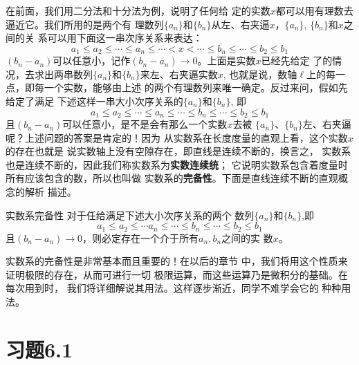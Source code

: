 在前面，我们用二分法和十分法为例，说明了任何给
定的实数$x$都可以用有理数去逼近它。我们所用的是两个有
理数列$\{a_n\}$和$\{b_n\}$从左、右夹逼$x$，$\{a_n\}$, $\{b_n\}$和$x$之间的关
系可以用下面这一串次序关系来表达：
\[a_1\le a_2\le\cdots\le a_n\le \cdots <x<\cdots\le b_n\le \cdots\le b_2\le b_1\]
$(b_n-a_n)$可以任意小，记作$(b_n-a_n)\to 0$。上面是实数$x$已经先给定
了的情况，去求出两串数列$\{a_n\}$和$\{b_n\}$来左、右夹逼实数$x$,
也就是说，数轴$\ell$上的每一点，即每一个实数，能够由上述
的两个有理数列来唯一确定。反过来问，假如先给定了满足
下述这样一串大小次序关系的$\{a_n\}$和$\{b_n\}$, 即
\[a_1\le a_2\le\cdots\le a_n\le \cdots \le b_n\le \cdots\le b_2\le b_1\]
且$(b_n-a_n)$可以任意小，是不是会有那么一个实数$x$去被
$\{a_n\}$、$\{b_n\}$左、右夹逼呢？上述问题的答案是肯定的！因为
从实数系在长度度量的直观上看，这个实数$x$的存在也就是
说实数轴上没有空隙存在，即直线是连续不断的，换言之，
实数系也是连续不断的，因此我们称实数系为\textbf{实数连续统}；
它说明实数系包含着度量时所有应该包含的数，所以也叫做
实数系的\textbf{完备性}。下面是直线连续不断的直观概念的解析
描述。

\begin{blk}{实数系完备性}
     对于任给满足下述大小次序关系的两个
数列$\{a_n\}$和$\{b_n\}$,即
\[a_1\le a_2\le \cdots a_n\le \cdots \le b_n\le \cdots \le b_2\le b_1\]
且$(b_n-a_n)\to 0$，则必定存在一个介于所有$a_n,b_n$之间的实
数$x$。
\end{blk}


实数系的完备性是非常基本而且重要的！在以后的章节
中，我们将用这个性质来证明极限的存在，从而可进行一切
极限运算，而这些运算乃是微积分的基础。在每次用到时，
我们将详细解说其用法。这样逐步渐近，同学不难学会它的
种种用法。

\section*{习题6.1}

